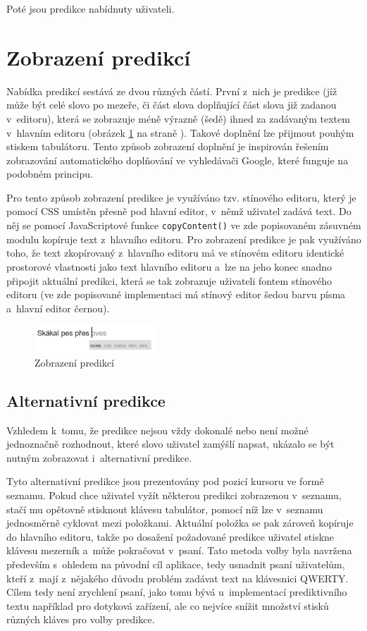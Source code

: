 \documentclass[a4paper,11pt,openany]{book} %
\begin{document}
Poté jsou predikce nabídnuty uživateli.

\section{Zobrazení predikcí}

Nabídka predikcí sestává ze dvou různých částí. První z~nich je predikce (jíž může být celé slovo po mezeře, či část slova doplňující část slova již zadanou v~editoru), která se zobrazuje méně výrazně (šedě) ihned za zadávaným textem v~hlavním editoru (obrázek \ref{fig:nlp-predict} na straně \pageref{fig:nlp-predict}). Takové doplnění lze přijmout pouhým stiskem tabulátoru. Tento způsob zobrazení doplnění je inspirován řešením zobrazování automatického doplňování ve vyhledávači Google, které funguje na podobném principu. 

Pro tento způsob zobrazení predikce je využíváno tzv. stínového editoru, který je pomocí CSS umístěn přesně pod hlavní editor, v~němž uživatel zadává text. Do něj se pomocí JavaScriptové funkce {\tt copyContent()} ve zde popisovaném zásuvném modulu kopíruje text z~hlavního editoru. Pro zobrazení predikce je pak využíváno toho, že text zkopírovaný z~hlavního editoru má ve stínovém editoru identické prostorové vlastnosti jako text hlavního editoru a~lze na jeho konec snadno připojit aktuální predikci, která se tak zobrazuje uživateli fontem stínového editoru (ve zde popisované implementaci má stínový editor šedou barvu písma a~hlavní editor černou).

\begin{figure}[ht]
	\centering
	\includegraphics[width=0.4\textwidth]{nlp_predict_1}
	\caption{Zobrazení predikcí}
	\label{fig:nlp-predict}
\end{figure}

\subsection{Alternativní predikce}

Vzhledem k~tomu, že predikce nejsou vždy dokonalé nebo není možné jednoznačně rozhodnout, které slovo uživatel zamýšlí napsat, ukázalo se být nutným zobrazovat i~alternativní predikce. 

Tyto alternativní predikce jsou prezentovány pod pozicí kursoru ve formě seznamu. Pokud chce uživatel vyžít některou predikci zobrazenou v~seznamu, stačí mu opětovně stisknout klávesu tabulátor, pomocí níž lze v~seznamu jednosměrně cyklovat mezi položkami. Aktuální položka se pak zároveň kopíruje do hlavního editoru, takže po dosažení požadované predikce uživatel stiskne klávesu mezerník a~může pokračovat v~psaní. Tato metoda volby byla navržena především s~ohledem na původní cíl aplikace, tedy usnadnit psaní uživatelům, kteří z~mají z~nějakého důvodu problém zadávat text na klávesnici QWERTY. Cílem tedy není zrychlení psaní, jako tomu bývá u~implementací prediktivního textu například pro dotyková zařízení, ale co nejvíce snížit množství stisků různých kláves pro volby predikce.
\end{document}
